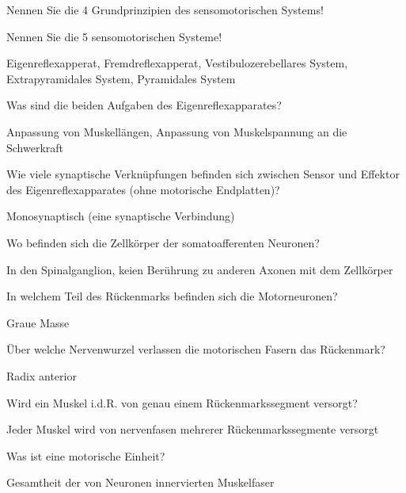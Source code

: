 \documentclass[10pt, a4paper]{exam}
\begin{document}
\begin{questions}
  \question Nennen Sie die 4 Grundprinzipien des sensomotorischen Systems!
  \begin{solution}

  \end{solution}

  \question Nennen Sie die 5 sensomotorischen Systeme!
  \begin{solution}
    Eigenreflexapperat, Fremdreflexapperat, Vestibulozerebellares System, Extrapyramidales System, Pyramidales System
  \end{solution}

  \question Was sind die beiden Aufgaben des Eigenreflexapparates?
  \begin{solution}
    Anpassung von Muskellängen, Anpassung von Muskelspannung an die Schwerkraft
  \end{solution}

  \question Wie viele synaptische Verknüpfungen befinden sich zwischen Sensor und Effektor des Eigenreflexapparates (ohne motorische Endplatten)?
  \begin{solution}
    Monosynaptisch (eine synaptische Verbindung)
  \end{solution}

  \question Wo befinden sich die Zellkörper der somatoafferenten Neuronen?
  \begin{solution}
    In den Spinalganglion, keien Berührung zu anderen Axonen mit dem Zellkörper
  \end{solution}

  \question In welchem Teil des Rückenmarks befinden sich die Motorneuronen?
  \begin{solution}
    Graue Masse
  \end{solution}

  \question Über welche Nervenwurzel verlassen die motorischen Fasern das Rückenmark?
  \begin{solution}
    Radix anterior
  \end{solution}

  \question Wird ein Muskel i.d.R. von genau einem Rückenmarkssegment versorgt?
  \begin{solution}
    Jeder Muskel wird von nervenfasen mehrerer Rückenmarkssegmente versorgt
  \end{solution}

  \question Was ist eine motorische Einheit?
  \begin{solution}
    Gesamtheit der von Neuronen innervierten Muskelfaser
  \end{solution}


\end{questions}
\end{document}
